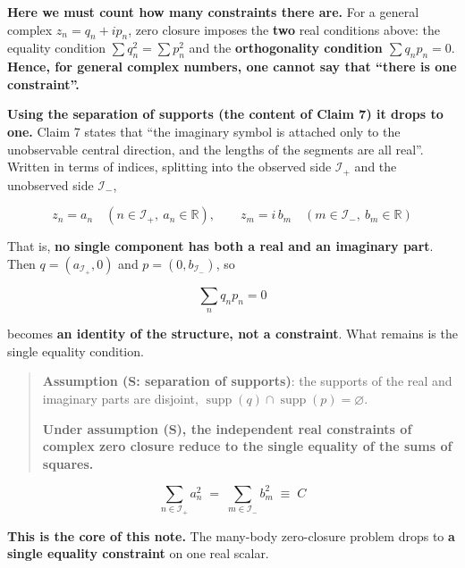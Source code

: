 \documentclass[
  10pt,
]{article}
\begin{document}
\textbf{Here we must count how many constraints there are.} For a
general complex \(z_n = q_n + ip_n\), zero closure imposes the
\textbf{two} real conditions above: the equality condition
\(\sum q_n^2 = \sum p_n^2\) and the \textbf{orthogonality condition
\(\sum q_np_n = 0\)}. \textbf{Hence, for general complex numbers, one
cannot say that ``there is one constraint''.}

\textbf{Using the separation of supports (the content of Claim 7) it
drops to one.} Claim 7 states that ``the imaginary symbol is attached
only to the unobservable central direction, and the lengths of the
segments are all real''. Written in terms of indices, splitting into the
observed side \(\mathcal{I}_+\) and the unobserved side
\(\mathcal{I}_-\),

\[z_n = a_n \quad (n \in \mathcal{I}_+, \ a_n \in \mathbb{R}), \qquad z_m = i\,b_m \quad (m \in \mathcal{I}_-, \ b_m \in \mathbb{R})\]

That is, \textbf{no single component has both a real and an imaginary
part}. Then \(q = (a_{\mathcal{I}_+}, 0)\) and
\(p = (0, b_{\mathcal{I}_-})\), so

\[\sum_n q_np_n = 0\]

becomes \textbf{an identity of the structure, not a constraint}. What
remains is the single equality condition.

\begin{quote}
\textbf{Assumption (S: separation of supports)}: the supports of the
real and imaginary parts are disjoint,
\(\operatorname{supp}(q) \cap \operatorname{supp}(p) = \varnothing\).

\textbf{Under assumption (S), the independent real constraints of
complex zero closure reduce to the single equality of the sums of
squares.}
\end{quote}

\[\boxed{\;\sum_{n \in \mathcal{I}_+} a_n^2 \;=\; \sum_{m \in \mathcal{I}_-} b_m^2 \;\equiv\; C\;}\]

\textbf{This is the core of this note.} The many-body zero-closure
problem drops to \textbf{a single equality constraint} on one real
scalar.
\end{document}
